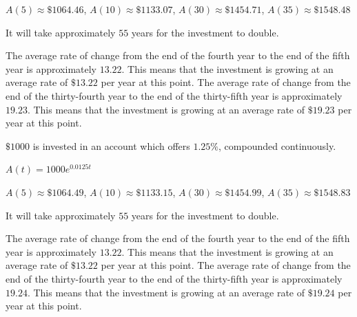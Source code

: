 \documentclass{ximera}
\begin{document}
\begin{question}
\begin{problem}
\begin{solution}
    $A(5) \approx \$ 1064.46$, $A(10) \approx \$ 1133.07$, $A(30) \approx \$ 1454.71$, $A(35) \approx \$ 1548.48$ 
\end{solution}

\begin{solution}
    It will take approximately $55$ years for the investment to double.
\end{solution}

\begin{solution}
    The average rate of change from the end of the fourth year to the end of the fifth year is approximately $13.22$.  This means that the investment is growing at an average rate of $\$13.22$ per year at this point.  The average rate of change from the end of the thirty-fourth year to the end of the thirty-fifth year is approximately $19.23$.  This means that the investment is growing at an average rate of $\$19.23$ per year at this point. 
\end{solution}
    
\end{problem}

\begin{problem}
    $\$1000$ is invested in an account which offers $1.25 \%$, compounded continuously.

\begin{solution}
    $A(t) = 1000e^{0.0125t}$
\end{solution}

\begin{solution}
    $A(5) \approx \$ 1064.49$, $A(10) \approx \$ 1133.15$, $A(30) \approx \$ 1454.99$, $A(35) \approx \$ 1548.83$ 
\end{solution}

\begin{solution}
    It will take approximately $55$ years for the investment to double.
\end{solution}

\begin{solution}
    The average rate of change from the end of the fourth year to the end of the fifth year is approximately $13.22$.  This means that the investment is growing at an average rate of $\$13.22$ per year at this point.  The average rate of change from the end of the thirty-fourth year to the end of the thirty-fifth year is approximately $19.24$.  This means that the investment is growing at an average rate of $\$19.24$ per year at this point. 
\end{solution}
    

\end{problem}
\end{question}
\end{document}
